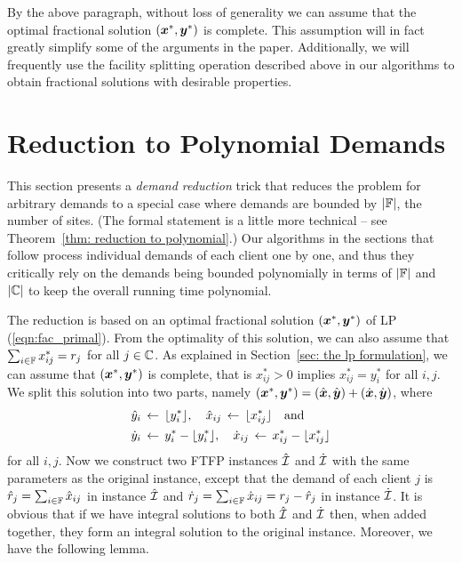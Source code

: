 \documentclass[11pt]{article}
\begin{document}
By the above paragraph,  without loss of generality we can
assume that the optimal fractional solution $(\boldsymbol{x}^\ast, \boldsymbol{y}^\ast)$
is complete. This assumption will in fact greatly simplify some of
the arguments in the paper. Additionally, we will frequently use the facility
splitting operation described above in our algorithms to obtain fractional solutions with
desirable properties.



\section{Reduction to Polynomial Demands}
\label{sec: polynomial demands}

This section presents a \emph{demand reduction} trick that
reduces the problem for arbitrary demands to a special case
where demands are bounded by $|\mathbb{F}|$, the number of
sites.  (The formal statement is a little more technical --
see Theorem~\ref{thm: reduction to polynomial}.)  Our
algorithms in the sections that follow process individual
demands of each client one by one, and thus they critically
rely on the demands being bounded polynomially in terms of
$|\mathbb{F}|$ and $|\mathbb{C}|$ to keep the overall running time polynomial.

The reduction is based on an optimal fractional solution
$(\boldsymbol{x}^\ast,\boldsymbol{y}^\ast)$ of LP (\ref{eqn:fac_primal}). From the
optimality of this solution, we can also assume that
$\sum_{i\in\mathbb{F}} x^\ast_{ij} = r_j$ for all
$j\in\mathbb{C}$.  As explained in Section~\ref{sec: the lp
  formulation}, we can assume that $(\boldsymbol{x}^\ast,\boldsymbol{y}^\ast)$
is complete, that is $x^\ast_{ij} > 0$ implies $x^\ast_{ij}
= y^\ast_i$ for all $i,j$.  We split this solution into two
parts, namely $(\boldsymbol{x}^\ast,\boldsymbol{y}^\ast) = (\hat{\boldsymbol{x}},\hat{\boldsymbol{y}})+
(\dot{\boldsymbol{x}},\dot{\boldsymbol{y}})$, where
%
\begin{align*}
{\hat y}_i &\;{\,\leftarrow\,}\; { \lfloor y_i^\ast \rfloor }, \quad
			{\hat x}_{ij} \;{\,\leftarrow\,}\; { \lfloor x_{ij}^\ast \rfloor } \quad\textrm{and}
			\\
{\dot y}_i &\;{\,\leftarrow\,}\; y_i^\ast - { \lfloor y_i^\ast \rfloor }, \quad
 	{\dot x}_{ij} \;{\,\leftarrow\,}\; x_{ij}^\ast -  { \lfloor x_{ij}^\ast \rfloor }
\end{align*}
%
for all $i,j$. Now we construct two
FTFP instances ${\hat{\cal I}}$ and ${\dot{\cal I}}$ with the same
parameters as the original instance, except that the demand of each client $j$ is
${\hat r}_j = \sum_{i\in\mathbb{F}} {\hat x}_{ij}$ in instance ${\hat{\cal I}}$ and
${\dot r}_j = \sum_{i\in\mathbb{F}} {\dot x}_{ij} = r_j - {\hat r}_j$ in instance ${\dot{\cal I}}$. 
It is obvious that if we have integral solutions to both ${\hat{\cal I}}$
and ${\dot{\cal I}}$ then, when added together, they form an integral
solution to the original instance.  Moreover, we have the
following lemma.
\end{document}
